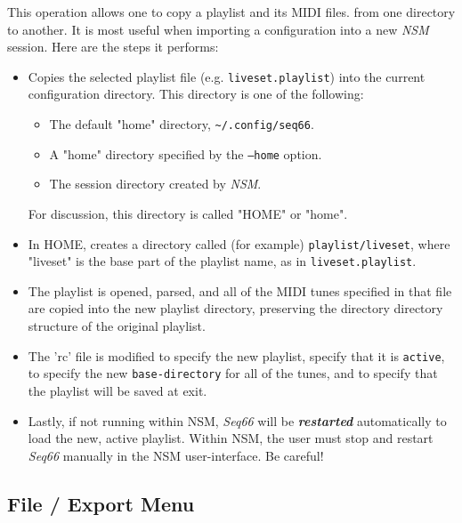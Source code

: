    This operation allows one to copy a playlist and its MIDI files.
   from one directory to another.  It is most useful when
   importing a configuration into a new \textsl{NSM} session.
   Here are the steps it performs:

   \begin{itemize}
      \item Copies the selected playlist file (e.g. \texttt{liveset.playlist})
         into the current configuration directory.
         This directory is one of the following:
         \begin{itemize}
            \item The default "home" directory,
               \texttt{\textasciitilde/.config/seq66}.
            \item A "home" directory specified by the \texttt{--home} option.
            \item The session directory created by \textsl{NSM}.
         \end{itemize}
         For discussion, this directory is called "HOME" or "home".
      \item In HOME, creates a directory called (for example)
         \texttt{playlist/liveset},
         where "liveset" is the base part of the playlist name, as in
         \texttt{liveset.playlist}.
      \item The playlist is opened, parsed, and all of the MIDI tunes specified
         in that file are copied into the new playlist directory, preserving
         the directory directory structure of the original playlist.
      \item The 'rc' file is modified to specify the new playlist,
         specify that it is \texttt{active},
         to specify the new \texttt{base-directory} for all of the tunes,
         and to specify that the playlist will be saved at exit.
      \item Lastly, if not running within NSM, \textsl{Seq66} will be
         \textsl{\textbf{restarted}} automatically to load the new,
         active playlist.
         Within NSM, the user must stop and restart \textsl{Seq66}
         manually in the NSM user-interface.
         Be careful!
   \end{itemize}

\subsection{File / Export Menu}
\label{subsec:midi_export_file_export_menu}

